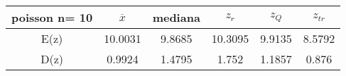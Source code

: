 \begin{tabular}{|c|c|c|c|c|c|}
\hline
poisson n= 10& $\overline{x}$ & mediana & $z_r$ & $z_Q$ & $z_{tr}$ \\ \hline
E(z) & 10.0031 & 9.8685 & 10.3095 & 9.9135 & 8.5792 \\ \hline
D(z) & 0.9924 & 1.4795 & 1.752 & 1.1857 & 0.876 \\ \hline
\end{tabular}